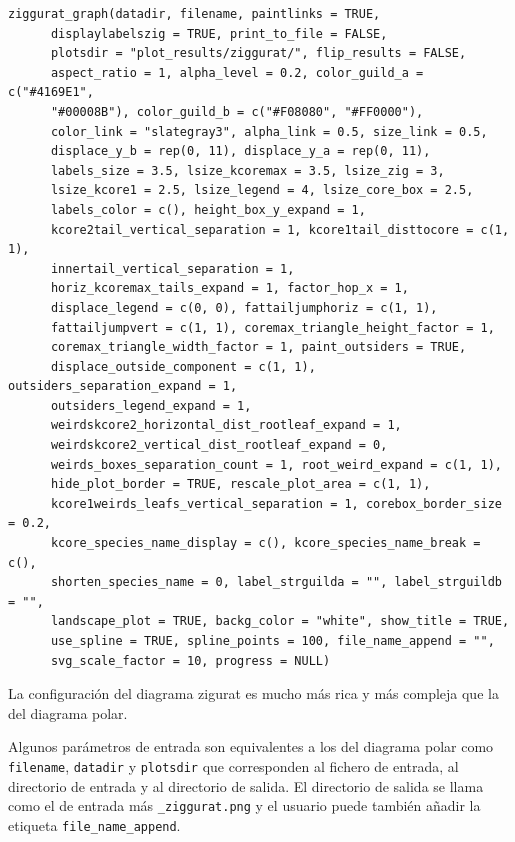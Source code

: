 \fontsize{3.5mm}{3.5mm}\selectfont
\begin{verbatim}
ziggurat_graph(datadir, filename, paintlinks = TRUE,
	  displaylabelszig = TRUE, print_to_file = FALSE,
	  plotsdir = "plot_results/ziggurat/", flip_results = FALSE,
	  aspect_ratio = 1, alpha_level = 0.2, color_guild_a = c("#4169E1",
	  "#00008B"), color_guild_b = c("#F08080", "#FF0000"),
	  color_link = "slategray3", alpha_link = 0.5, size_link = 0.5,
	  displace_y_b = rep(0, 11), displace_y_a = rep(0, 11), 
	  labels_size = 3.5, lsize_kcoremax = 3.5, lsize_zig = 3, 
	  lsize_kcore1 = 2.5, lsize_legend = 4, lsize_core_box = 2.5, 
	  labels_color = c(), height_box_y_expand = 1, 
	  kcore2tail_vertical_separation = 1, kcore1tail_disttocore = c(1, 1), 
	  innertail_vertical_separation = 1,
	  horiz_kcoremax_tails_expand = 1, factor_hop_x = 1,
	  displace_legend = c(0, 0), fattailjumphoriz = c(1, 1),
	  fattailjumpvert = c(1, 1), coremax_triangle_height_factor = 1,
	  coremax_triangle_width_factor = 1, paint_outsiders = TRUE,
	  displace_outside_component = c(1, 1), outsiders_separation_expand = 1,
	  outsiders_legend_expand = 1,
	  weirdskcore2_horizontal_dist_rootleaf_expand = 1,
	  weirdskcore2_vertical_dist_rootleaf_expand = 0,
	  weirds_boxes_separation_count = 1, root_weird_expand = c(1, 1),
	  hide_plot_border = TRUE, rescale_plot_area = c(1, 1),
	  kcore1weirds_leafs_vertical_separation = 1, corebox_border_size = 0.2,
	  kcore_species_name_display = c(), kcore_species_name_break = c(),
	  shorten_species_name = 0, label_strguilda = "", label_strguildb = "",
	  landscape_plot = TRUE, backg_color = "white", show_title = TRUE,
	  use_spline = TRUE, spline_points = 100, file_name_append = "",
	  svg_scale_factor = 10, progress = NULL)
\end{verbatim}
\normalsize

La configuración del diagrama zigurat es mucho más rica y más compleja que la del diagrama polar. 
%

Algunos parámetros de entrada son equivalentes a los del  diagrama polar como \texttt{filename}, \texttt{datadir} y \texttt{plotsdir} que 
corresponden al fichero de entrada, al directorio de entrada y al directorio de salida. El directorio de salida se llama
como el de entrada más \texttt{\_ziggurat.png} y el usuario puede también añadir la etiqueta \texttt{file\_name\_append}.

